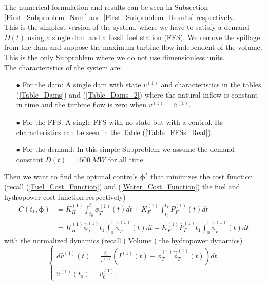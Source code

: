 The numerical formulation and results can be seen in Subsection \ref{First_Subproblem_Num} and \ref{First_Subproblem_Results} respectively.\\

This is the simplest version of the system, where we have to satisfy a demand $D(t)$ using a single dam and a fossil fuel station (FFS). We remove the spillage from the dam and suppose the maximum turbine flow independent of the volume. This is the only Subproblem where we do not use dimensionless units.\\

The characteristics of the system are:

\begin{enumerate}

\item[$\bullet$] For the dam: A single dam with state $v^{(1)}$ and characteristics in the tables (\ref{Table_Dams}) and (\ref{Table_Dams_2}) where the natural inflow is constant in time and the turbine flow is zero when $v^{(1)}=\overline{v}^{(1)}$.

\item[$\bullet$] For the FFS: A single FFS with no state but with a control. Its characteristics can be seen in the Table (\ref{Table_FFSs_Real}).

\item[$\bullet$] For the demand: In this simple Subproblem we assume the demand constant $D(t)=\SI{1500}{MW}$ for all time.

\end{enumerate}
Then we want to find the optimal controls $\bm{\phi}^*$ that minimizes the cost function (recall (\ref{Fuel_Cost_Function}) and (\ref{Water_Cost_Function}) the fuel and hydropower cost function respectively)
\begin{equation}
\begin{split}
C(t_1,\bm{\phi})&=K_H^{(1)}\int_{t_0}^{t_1}\phi_T^{(1)}(t)dt+K_F^{(1)}\int_{t_0}^{t_1}P_F^{(1)}(t)dt\\
&=K_H^{(1)}\overline{\phi}_T^{(1)}t_1\int_{0}^{1}\hat{\phi}_T^{(1)}(t)dt+K_F^{(1)}\overline{P}_F^{(1)}t_1\int_{0}^{1}\hat{\phi}_F^{(1)}(t)dt
\end{split}
\end{equation}
with the normalized dynamics (recall (\ref{Volume}) the hydropower dynamics)
\begin{equation}
\begin{cases}
d\hat{v}^{(1)}(t)=\frac{t_1}{\overline{v}^{(1)}}\left(I^{(1)}(t)-\overline{\phi}_T^{(1)}\hat{\phi}_T^{(1)}(t)\right)dt\\
\hat{v}^{(1)}(t_0)=\hat{v}_0^{(1)}.
\end{cases}
\end{equation}
